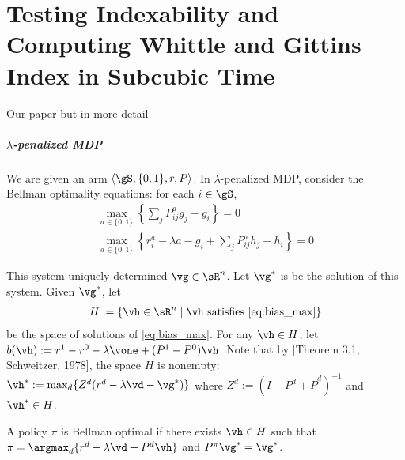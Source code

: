 \chapter{Testing Indexability and Computing Whittle and Gittins Index in Subcubic Time}
\label{ch:mab_problem}

Our paper but in more detail

\paragraph{$\lambda$-penalized MDP}

We are given an arm $\langle\gS,\{0,1\},r,P\rangle$. In $\lambda$-penalized MDP, consider the Bellman optimality equations: for each $i\in\gS$,
\begin{align}
    \max_{a\in\{0,1\}}{\left\{\sum_jP^a_{ij}g_j-g_i\right\}} =0 \label{eq:gain_max}\\
\max_{a\in\{0,1\}}{\left\{r^a_i-\lambda a-g_i +\sum_jP^a_{ij}h_j-h_i\right\}} =0 \label{eq:bias_max}
\end{align}

This system uniquely determined $\vg\in\sR^n$.
Let $\vg^*$ is be the solution of this system. Given $\vg^*$, let
\begin{align}
H:=\{\vh\in \sR^n \mid \vh \text{ satisfies } \eqref{eq:bias_max}\}
\end{align}
be the space of solutions of \eqref{eq:bias_max}.
For any $\vh\in H$, let $b(\vh):=r^1-r^0-\lambda \vone +(P^1-P^0)\vh$. 
Note that by [Theorem 3.1, Schweitzer, 1978], the space $H$ is nonempty: $\vh^*:=\max_d\{Z^d(r^d -\lambda \vd -\vg^*)\}$ where $Z^d:=(I-P^d +\bar{P}^d)^{-1}$ and $\vh^*\in H$.

\begin{defn}
\label{defn:BO_policy}
A policy $\pi$ is Bellman optimal if there exists $\vh\in H$ such that $\pi=\argmax_d\{r^d -\lambda \vd +P^d\vh\}$ and $P^\pi\vg^*=\vg^*$.
\end{defn}

